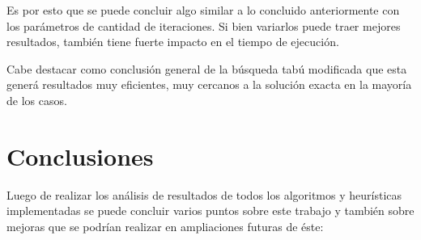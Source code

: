 \documentclass[a4paper,10pt]{article}
\begin{document}
Es por esto que se puede concluir algo similar a lo concluido anteriormente con los par\'ametros de cantidad de iteraciones. Si bien variarlos puede traer mejores resultados, tambi\'en tiene fuerte impacto en el tiempo de ejecuci\'on. 

Cabe destacar como conclusi\'on general de la b\'usqueda tab\'u modificada que esta gener\'a resultados muy eficientes, muy cercanos a la soluci\'on exacta en la mayor\'ia de los casos.



\section*{Conclusiones}

Luego de realizar los an\'alisis de resultados de todos los algoritmos y heur\'isticas implementadas se puede concluir varios puntos sobre este trabajo y tambi\'en sobre mejoras que se podr\'ian realizar en ampliaciones futuras de \'este:
\end{document}
